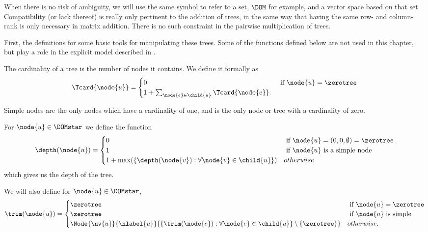 When there is no risk of ambiguity, we will use the same symbol to
refer to a set, $\DOM$ for example, and a vector space based on that
set. Compatibility (or lack thereof) is really only pertinent to the
addition of trees, in the same way that having the same row- and
column-rank is only necessary in matrix addition.  There is no such
constraint in the pairwise multiplication of trees.


First, the definitions for some basic tools for manipulating these
trees. Some of the functions defined below are not used in this chapter, but
play a role in the explicit model described in \Cfive.

\begin{definition}
  The cardinality of a tree is the number of nodes it contains. We
  define it formally as
  \begin{align*}
  \Tcard{\node{u}} = \begin{cases}
    0 & \text{ if } \node{u} = \zerotree\\
    1 + \sum_{\node{e}\in\child{u}} \Tcard{\node{e}}.
    \end{cases}
  \end{align*}

Simple nodes are the only nodes which have a cardinality of one, and \tzerotree is the only node or tree with a
cardinality of zero.
\end{definition}

\begin{definition}
  For \(\node{u} \in \DOMstar\) we define the function
  \begin{align*}
    \depth(\node{u}) = \begin{cases}
      0 & \text{ if } \node{u} = (0,0,\emptyset) = \zerotree \\
      1 & \text{ if } \node{u} \text{ is a simple node} \\
      1 + \max(\lbrace\depth(\node{v}):\forall \node{v} \in \child{u}\rbrace) & otherwise
    \end{cases}
  \end{align*}
  which gives us the depth of the tree.
\end{definition}

\begin{definition}
  We will also define for \(\node{u} \in \DOMstar\),
  \begin{align*}
      \trim(\node{u}) = \begin{cases}
        \zerotree & \text{ if } \node{u} = \zerotree \\
        \zerotree & \text{ if } \node{u} \text{ is simple} \\
        \Node{\nv{u}}{\nlabel{u}}{\lbrace \trim(\node{e}): \forall\node{e}\in\child{u} \rbrace \setminus \{\zerotree\}} & otherwise.
      \end{cases}
  \end{align*}
\end{definition}


